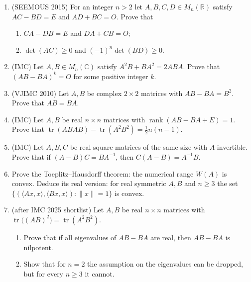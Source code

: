 \documentclass[11pt,a4paper]{article}
\DeclareMathOperator{\tr}{tr}
\DeclareMathOperator{\rank}{rank}
\begin{document}
\begin{enumerate}
\item (SEEMOUS 2015) For an integer $n>2$ let $A,B,C,D\in M_n(\mathbb R)$ satisfy $AC-BD=E$ and
$AD+BC=O$. Prove that
\begin{enumerate}[label=\alph*),align=left]
\item $CA-DB=E$ and $DA+CB=O$;
\item $\det(AC)\geqslant0$ and $(-1)^n\det(BD)\geqslant0$.
\end{enumerate}

\item (IMC) Let $A,B\in M_n(\mathbb C)$ satisfy $A^2B+BA^2=2ABA$. Prove that $(AB-BA)^k=O$ for
some positive integer $k$.

\item (VJIMC 2010) Let $A,B$ be complex $2\times2$ matrices with $AB-BA=B^2$. Prove that $AB=BA$.

\item (IMC) Let $A,B$ be real $n\times n$ matrices with $\rank(AB-BA+E)=1$. Prove that
$\tr(ABAB)-\tr(A^2B^2)=\frac12n(n-1)$.

\item (IMC) Let $A,B,C$ be real square matrices of the same size with $A$ invertible. Prove that
if $(A-B)C=BA^{-1}$, then $C(A-B)=A^{-1}B$.

\item Prove the Toeplitz--Hausdorff theorem: the numerical range $W(A)$ is convex. Deduce its real
version: for real symmetric $A,B$ and $n\geqslant3$ the set
$\{(\langle Ax,x\rangle,\langle Bx,x\rangle):\|x\|=1\}$ is convex.

\item (after IMC 2025 shortlist) Let $A,B$ be real $n\times n$ matrices with
$\tr\bigl((AB)^2\bigr)=\tr(A^2B^2)$.
\begin{enumerate}[label=\alph*),align=left]
\item Prove that if all eigenvalues of $AB-BA$ are real, then $AB-BA$ is nilpotent.
\item Show that for $n=2$ the assumption on the eigenvalues can be dropped, but for every
$n\geqslant3$ it cannot.
\end{enumerate}
\end{enumerate}
\end{document}
